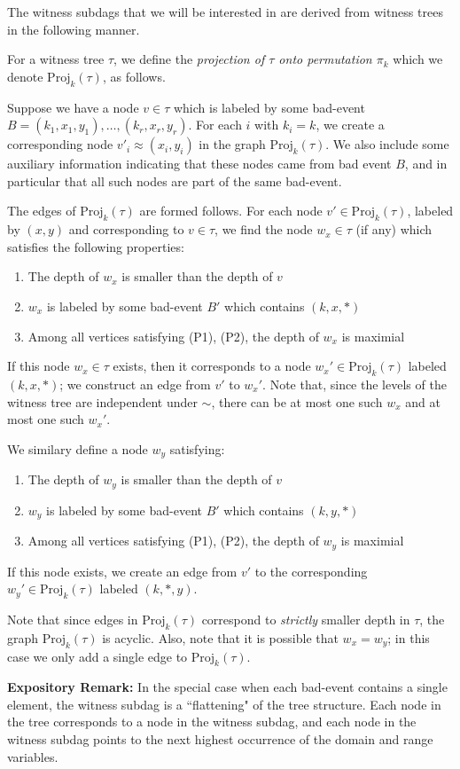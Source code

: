 The witness subdags that we will be interested in are derived from witness trees in the following manner.
\begin{definition}
For a witness tree $\tau$, we define the \emph{projection of $\tau$ onto permutation $\pi_k$} which we denote $\text{Proj}_k(\tau)$, as follows.

Suppose we have a node $v \in \tau$ which is labeled by some bad-event $B = (k_1, x_1, y_1), \dots, (k_r, x_r, y_r)$. For each $i$ with $k_i = k$, we create a corresponding node $v'_i \approx (x_i, y_i)$ in the graph $\text{Proj}_k(\tau)$. We also include some auxiliary information indicating that these nodes came from bad event $B$, and in particular that all such nodes are part of the same bad-event.

The edges of $\text{Proj}_k(\tau)$ are formed follows. For each node $v' \in \text{Proj}_k(\tau)$, labeled by $(x,y)$ and corresponding to $v \in \tau$, we find the node $w_x \in \tau$ (if any) which satisfies the following properties:
\begin{enumerate}
\item[(P1)] The depth of $w_x$ is smaller than the depth of $v$
\item[(P2)] $w_x$ is labeled by some bad-event $B'$ which contains $(k,x, *)$
\item[(P3)] Among all vertices satisfying (P1), (P2), the depth of $w_x$ is maximial
\end{enumerate}

If this node $w_x \in \tau$ exists, then it corresponds to a node $w_x' \in \text{Proj}_k(\tau)$ labeled $(k, x, *)$; we construct an edge from $v'$ to $w_x'$. Note that, since the levels of the witness tree are independent under $\sim$, there can be at most one such $w_x$ and at most one such $w_x'$.

We similary define a node $w_y$ satisfying:
\begin{enumerate}
\item[(P1')] The depth of $w_y$ is smaller than the depth of $v$
\item[(P2')] $w_y$ is labeled by some bad-event $B'$ which contains $(k,y, *)$
\item[(P3')] Among all vertices satisfying (P1), (P2), the depth of $w_y$ is maximial
\end{enumerate}
If this node exists, we create an edge from $v'$ to the corresponding $w_y' \in \text{Proj}_k(\tau)$ labeled $(k,*,y)$.

Note that since edges in $\text{Proj}_k(\tau)$ correspond to \emph{strictly} smaller depth in $\tau$, the graph $\text{Proj}_k (\tau)$ is acyclic. Also, note that it is possible that $w_x = w_y$; in this case we only add a single edge to $\text{Proj}_k(\tau)$.

\textbf{Expository Remark:} In the special case when each bad-event contains a single element, the witness subdag is a ``flattening" of the tree structure. Each node in the tree corresponds to a node in the witness subdag, and each node in the witness subdag points to the next highest occurrence of the domain and range variables.
\end{definition}



